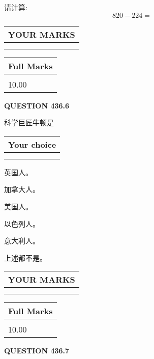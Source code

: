 \documentclass{ctexart}
\begin{document}
  
 
请计算:
\begin{equation}
820 -   %
224 = \nonumber
\end{equation}
 

 

 
  
\vspace{0.2in}
  
\noindent\begin{tabular}{|l|}
\hline
 YOUR MARKS  \\
\hline
 \\ 
 \\ 
\hline
\end{tabular}
\hspace{0.05in} \begin{tabular}{|l|}
\hline
 Full Marks  \\
\hline
 \\ 
10.00 \\
\hline
\end{tabular}
{\textbf{\Large{QUESTION
436.6 
}}}
  
  
科学巨匠牛顿是
  
  
\noindent\hspace{3.0in} \begin{tabular}{|l|}
\hline
Your choice \\
\hline
 \\ 
 \\ 
\hline
\end{tabular}
  
  
 
 
英国人。
 
 
加拿大人。
 
 
美国人。
 
 
以色列人。
 
 
意大利人。
 
 
 上述都不是。
 
 
  
\vspace{0.2in}
  
\noindent\begin{tabular}{|l|}
\hline
 YOUR MARKS  \\
\hline
 \\ 
 \\ 
\hline
\end{tabular}
\hspace{0.05in} \begin{tabular}{|l|}
\hline
 Full Marks  \\
\hline
 \\ 
10.00 \\
\hline
\end{tabular}
{\textbf{\Large{QUESTION
436.7 
}}}
  
\end{document}
